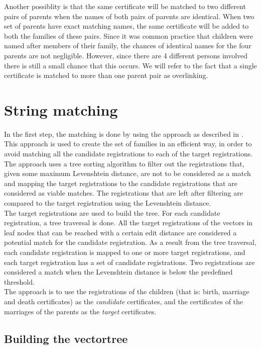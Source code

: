 Another possiblity is that the same certificate will be matched to two different pairs of parents when the names of both pairs of parents are identical. When two set of parents have exact matching names, the same certificate will be added to both the families of these pairs. Since it was common practice that children were named after members of their family, the chances of identical names for the four parents are not negligible. However, since there are 4 different persons involved there is still a small chance that this occurs. We will refer to the fact that a single certificate is matched to more than one parent pair as overlinking.\newline

\section{String matching}
In the first step, the matching is done by using the approach as described in \cite{Aspects001}. This approach is used to create the set of families in an efficient way, in order to avoid matching all the candidate registrations to each of the target registrations. The approach uses a tree sorting algorithm to filter out the registrations that, given some maximum Levenshtein distance, are not to be considered as a match and mapping the target registrations to the candidate registrations that are considered as viable matches. The registrations that are left after filtering are compared to the target registration using the Levenshtein distance. \\
The target registrations are used to build the tree. For each candidate registration, a tree traversal is done. All the target registrations of the vectors in leaf nodes that can be reached with a certain edit distance are considered a potential match for the candidate registration. As a result from the tree traversal, each candidate registration is mapped to one or more target registrations, and each target registration has a set of candidate registrations. Two registrations are considered a match when the Levenshtein distance is below the predefined threshold. \\
The approach is to use the registrations of the children (that is: birth, marriage and death certificates) as the \textit{candidate} certificates, and the certificates of the marriages of the parents as the \textit{target} certificates.

\subsection{Building the vectortree}

